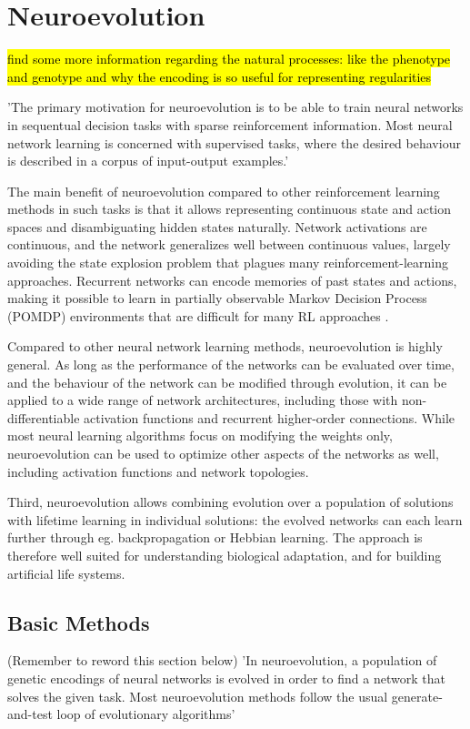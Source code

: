 \section{Neuroevolution}

\hl{find some more information regarding the natural processes: like the phenotype and genotype and why the encoding is so useful for representing regularities}

'The primary motivation for neuroevolution is to be able to train neural networks in sequentual decision tasks with sparse reinforcement information. Most neural network learning is concerned with supervised tasks, where the desired behaviour is described in a corpus of input-output examples.' \cite{Miikkulainen2010}

The main benefit of neuroevolution compared to other reinforcement learning methods in such tasks is that it allows representing continuous state and action spaces and disambiguating hidden states naturally.
Network activations are continuous, and the network generalizes well between continuous values, largely avoiding the state explosion problem that plagues many reinforcement-learning approaches. Recurrent networks can encode memories of past states and actions, making it possible to learn in partially observable Markov Decision Process (POMDP) environments that are difficult for many RL approaches \cite{Miikkulainen2010}.

Compared to other neural network learning methods, neuroevolution is highly general. As long as the performance of the networks can be evaluated over time, and the behaviour of the network can be modified through evolution, it can be applied to a wide range of network architectures, including those with non-differentiable activation functions and recurrent  higher-order connections. While most neural learning algorithms focus on modifying the weights only, neuroevolution can be used to optimize other aspects of the networks as well, including activation functions and network topologies.

Third, neuroevolution allows combining evolution over a population of solutions with lifetime learning in individual solutions: the evolved networks can each learn further through eg. backpropagation or Hebbian learning. The approach is therefore well suited for understanding biological adaptation, and for building artificial life systems.

\subsection{Basic Methods}
(Remember to reword this section below)
'In neuroevolution, a population of genetic encodings of neural networks is evolved in order to find a network that solves the given task. Most neuroevolution methods follow the usual generate-and-test loop of evolutionary algorithms' \cite{Miikkulainen2010}

